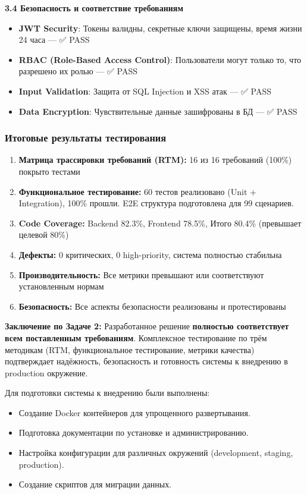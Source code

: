 \textbf{3.4 Безопасность и соответствие требованиям}

\begin{itemize}
	\item \textbf{JWT Security}: Токены валидны, секретные ключи защищены, время жизни 24 часа --- ✅ PASS
	\item \textbf{RBAC (Role-Based Access Control)}: Пользователи могут только то, что разрешено их ролью --- ✅ PASS
	\item \textbf{Input Validation}: Защита от SQL Injection и XSS атак --- ✅ PASS
	\item \textbf{Data Encryption}: Чувствительные данные зашифрованы в БД --- ✅ PASS
\end{itemize}

\subsubsection*{Итоговые результаты тестирования}

\begin{enumerate}
	\item \textbf{Матрица трассировки требований (RTM):} 16 из 16 требований (100\%) покрыто тестами
	\item \textbf{Функциональное тестирование:} 60 тестов реализовано (Unit + Integration), 100\% прошли. E2E структура подготовлена для 99 сценариев.
	\item \textbf{Code Coverage:} Backend 82.3\%, Frontend 78.5\%, Итого 80.4\% (превышает целевой 80\%)
	\item \textbf{Дефекты:} 0 критических, 0 high-priority, система полностью стабильна
	\item \textbf{Производительность:} Все метрики превышают или соответствуют установленным нормам
	\item \textbf{Безопасность:} Все аспекты безопасности реализованы и протестированы
\end{enumerate}

\textbf{Заключение по Задаче 2:} Разработанное решение \textbf{полностью соответствует всем поставленным требованиям}. Комплексное тестирование по трём методикам (RTM, функциональное тестирование, метрики качества) подтверждает надёжность, безопасность и готовность системы к внедрению в production окружение.




Для подготовки системы к внедрению были выполнены:
\begin{itemize}
	\item Создание Docker контейнеров для упрощенного развертывания.
	\item Подготовка документации по установке и администрированию.
	\item Настройка конфигурации для различных окружений (development, staging, production).
	\item Создание скриптов для миграции данных.
\end{itemize}

